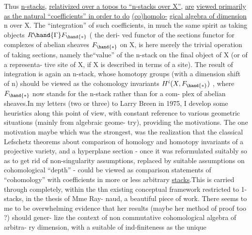 Thus \uline{n-stacks}, \uline{relativized over a topos to ``n-stacks over X''}, \uline{are}
\uline{viewed primarily as the natural ``coefficients'' in order to do} \uline{(co)homolo-}%
\uline{gical algebra of dimension} \over{$<$}{$\le$} n over X. The ``integration'' of such
coefficients, in much the same spirit as taking objects $R\hand{\Gamma}F_{\hand{\ast}}$ ( the deri-%
ved functor of the sections functor \inserted{$\Gamma$}\hand{)} for complexes of abelian sheaves $F_{\hand{\ast}}$
on X, is here merely the trivial operation of taking sections, namely
the``value'' of the n-stack on the final object of X (or of a representa-%
tive site of X, if X is described in terms of a site). The result of
integration is again an n-stack, whose homotopy  groups (with a
dimension shift of n) should be viewed as the cohomology invariants
$H^i(X,F_{\hand{\ast}})$ , where $F_{\hand{\ast}}$ now stands for the n-stack rather than for a com-%
plex of abelian sheaves.In my letters (two or three) to Larry Breen in
1975, I develop some heuristics along this point of view, with constant
reference to various geometric situations (mainly from algebraic geome-%
try), providing the motivations. The one motivation maybe which was
the strongest, was the realization that the classical Lefschetz theorems
about comparison of homology and homotopy invariants of a projective
variety, and a hyperplane section - once it was reformulated suitably
so as to get rid of non-singularity assumptions, replaced by suitable
assumptions on cohomological ``depth'' - could be viewed as comparison
statements of ``cohomology'' with coefficients in more or less arbitrary
\uline{stacks}.This is carried through completely, within the thn existing
conceptual framework restricted to 1-stacks, in the thesis of Mme Ray-%
naud, a beautiful piece of work. There seems to me to be overwhelming
evidence that her results (maybe her method of proof too ?) should gener-%
lize  the context of non commutative cohomological algebra of arbitra-%
ry dimension, with a suitable  of ind-finiteness as the unique
